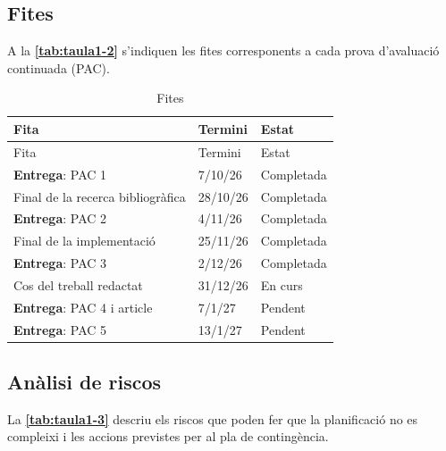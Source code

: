 \documentclass[CAT]{TFUOC}%
\begin{document}
\pagebreak

\subsection{Fites}\label{fites}

A la \textbf{\autoref{tab:taula1-2}} s'indiquen les fites corresponents a cada prova d'avaluació continuada (PAC).

\begin{longtable}[]{@{}lll@{}}
\caption{Fites}\label{tab:taula1-2}\tabularnewline
\toprule\noalign{}
Fita & Termini & Estat \\
\midrule\noalign{}
\endfirsthead
\toprule\noalign{}
Fita & Termini & Estat \\
\midrule\noalign{}
\endhead
\bottomrule\noalign{}
\endlastfoot
\textbf{Entrega}: PAC 1 & 7/10/26 & Completada \\
Final de la recerca bibliogràfica & 28/10/26 & Completada \\
\textbf{Entrega}: PAC 2 & 4/11/26 & Completada \\
Final de la implementació & 25/11/26 & Completada \\
\textbf{Entrega}: PAC 3 & 2/12/26 & Completada \\
Cos del treball redactat & 31/12/26 & En curs \\
\textbf{Entrega}: PAC 4 i article & 7/1/27 & Pendent \\
\textbf{Entrega}: PAC 5 & 13/1/27 & Pendent \\
\end{longtable}

\subsection{Anàlisi de riscos}\label{anuxe0lisi-de-riscos}

La \textbf{\autoref{tab:taula1-3}} descriu els riscos que poden fer que la planificació no es compleixi i les accions previstes per al pla de contingència.
\end{document}
